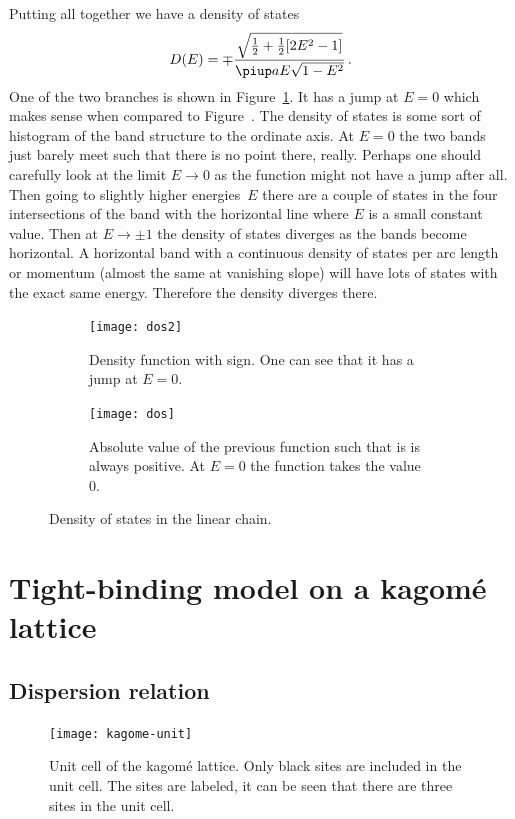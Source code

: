 \documentclass[11pt, english, fleqn, DIV=15, headinclude, BCOR=1cm]{scrartcl}
\begin{document}
Putting all together we have a density of states
\[
    D(E) = \mp \frac{\sqrt{\frac 12 + \frac 12 [2 E^2 - 1]}}{\piup a E \sqrt{1 -
    E^2}} \,.
\]
One of the two branches is shown in Figure~\ref{fig:dos/2}. It has a jump at $E
= 0$ which makes sense when compared to Figure~\label{fig:band-3}. The density
of states is some sort of histogram of the band structure to the ordinate axis.
At $E = 0$ the two bands just barely meet such that there is no point there,
really. Perhaps one should carefully look at the limit $E \to 0$ as the
function might not have a jump after all. Then going to slightly higher
energies~$E$ there are a couple of states in the four intersections of the band
with the horizontal line where $E$ is a small constant value. Then at $E \to
\pm 1$ the density of states diverges as the bands become horizontal. A
horizontal band with a continuous density of states per arc length or momentum
(almost the same at vanishing slope) will have lots of states with the exact
same energy. Therefore the density diverges there.

\begin{figure}
    \begin{subfigure}[t]{0.47\linewidth}
        \centering
        \texttt{[image: dos2]}
        \caption{%
            Density function with sign. One can see that it has a jump at $E =
            0$.
        }
        \label{fig:dos/2}
    \end{subfigure}
    \hfill
    \begin{subfigure}[t]{0.47\linewidth}
        \centering
        \texttt{[image: dos]}
        \caption{%
            Absolute value of the previous function such that is is always
            positive. At $E = 0$ the function takes the value 0.
        }
        \label{fig:dos/1}
    \end{subfigure}
    \caption{%
        Density of states in the linear chain.
    }
    \label{fig:dos}
\end{figure}


\section{Tight-binding model on a kagomé lattice}
\label{homework:2}

\subsection{Dispersion relation}

\begin{figure}
    \centering
    \texttt{[image: kagome-unit]}
    \caption{%
        Unit cell of the kagomé lattice. Only black sites are included in the
        unit cell. The sites are labeled, it can be seen that there are three
        sites in the unit cell.
    }
    \label{fig:kagome-unit}
\end{figure}
\end{document}
